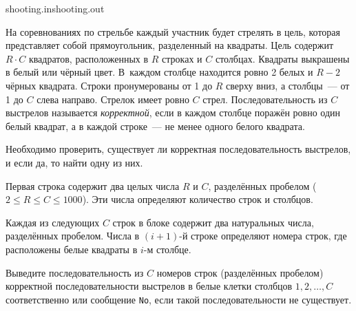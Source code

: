 \begin{rawproblem}{shooting.in}{shooting.out}

На соревнованиях по стрельбе каждый участник будет стрелять в цель, которая 
представляет собой прямоугольник, разделенный на квадраты. Цель содержит $R\cdot C$
квадратов, расположенных в $R$ строках и $C$ столбцах.
Квадраты выкрашены в белый или чёрный цвет.
В~каждом столбце находится ровно 2 белых и $R-2$ чёрных квадрата.
Строки пронумерованы от 1 до $R$ сверху вниз, а столбцы~--- от 1 до $C$ слева 
направо.
Стрелок имеет ровно $C$ стрел.
Последовательность из $C$ выстрелов называется \textit{корректной},
если в каждом столбце поражён ровно один белый квадрат,
а в каждой строке~--- не менее одного белого квадрата.

Необходимо проверить, 
существует ли корректная последовательность выстрелов, и если да, то найти одну 
из них.

\InputFile

Первая строка содержит два целых числа $R$ и $C$,
разделённых пробелом ($2 \le R \le C \le 1000$).
Эти числа определяют количество строк и столбцов.

Каждая из следующих $C$ строк в блоке содержит два натуральных числа,
разделённых пробелом.
Числа в $(i+1)$-й строке определяют номера строк, где 
расположены белые квадраты в $i$-м столбце.

\OutputFile

Выведите последовательность из $C$ номеров строк (разделённых пробелом)
корректной последовательности выстрелов в белые 
клетки столбцов $1, 2, \ldots, C$ соответственно или сообщение \texttt{No}, если такой 
последовательности не существует.

\Example

\begin{example}%
%
\end{example}

\end{rawproblem}
